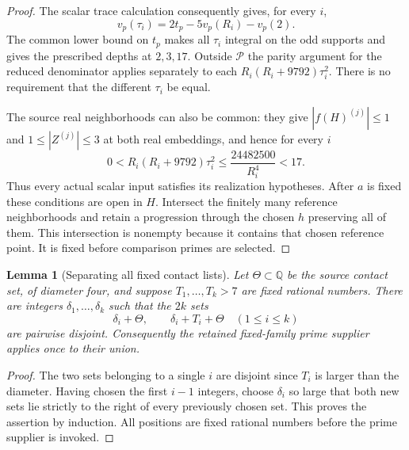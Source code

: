 \documentclass[11pt]{article}
\newtheorem{lemma}[theorem]{Lemma}
\begin{document}
\begin{proof}
The scalar trace calculation consequently gives, for every $i$,
\[
              v_p(\tau_i)=2t_p-5v_p(R_i)-v_p(2).
\]
The common lower bound on $t_p$ makes all $\tau_i$ integral on the
odd supports and gives the prescribed depths at $2,3,17$.  Outside
$\mathcal P$ the parity argument for the reduced denominator applies
separately to each $R_i(R_i+9792)\tau_i^2$.  There is no requirement
that the different $\tau_i$ be equal.

The source real neighborhoods can also be common: they give
$|f(H)^{(j)}|\le1$ and $1\le|Z^{(j)}|\le3$ at both real embeddings,
and hence for every $i$
\[
       0<R_i(R_i+9792)\tau_i^2
         \le\frac{24482500}{R_i^4}<17.
\]
Thus every actual scalar input satisfies its realization hypotheses.
After $a$ is fixed these conditions are open in $H$.  Intersect the
finitely many reference neighborhoods and retain a progression through
the chosen $h$ preserving all of them.  This intersection is nonempty
because it contains that chosen reference point.  It is fixed before
comparison primes are selected.
\end{proof}

\begin{lemma}[Separating all fixed contact lists]
\label{lem:contact-offsets}
Let $\Theta\subset\mathbb Q$ be the source contact set, of diameter
four, and suppose $T_1,\ldots,T_k>7$ are fixed rational numbers.
There are integers $\delta_1,\ldots,\delta_k$ such that the $2k$
sets
\[
       \delta_i+\Theta,\qquad \delta_i+T_i+\Theta
                      \quad(1\le i\le k)
\]
are pairwise disjoint.  Consequently the retained fixed-family prime
supplier applies once to their union.
\end{lemma}
\begin{proof}
The two sets belonging to a single $i$ are disjoint since $T_i$ is
larger than the diameter.  Having chosen the first $i-1$ integers,
choose $\delta_i$ so large that both new sets lie strictly to the
right of every previously chosen set.  This proves the assertion
by induction.  All positions are fixed rational numbers before the
prime supplier is invoked.
\end{proof}
\end{document}
